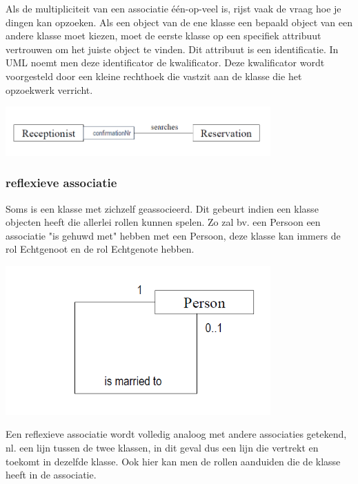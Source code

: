 Als de multipliciteit van een associatie één-op-veel is, rijst vaak de vraag hoe je dingen kan opzoeken. Als een object van de ene klasse een bepaald object van een andere klasse moet kiezen, moet de eerste klasse op een specifiek attribuut vertrouwen om het juiste object te vinden. Dit attribuut is een identificatie.
In UML noemt men deze identificator de kwalificator. Deze kwalificator wordt voorgesteld door een kleine rechthoek die vastzit aan de klasse die het opzoekwerk verricht.


\begin{center}
\includegraphics[width=4in]{img/qa1}%
\end{center}

\subsubsection{reflexieve associatie}

Soms is een klasse met zichzelf geassocieerd. Dit gebeurt indien een klasse objecten heeft die allerlei rollen kunnen spelen. Zo zal bv. een Persoon een associatie "is gehuwd met" hebben met een Persoon, deze klasse kan immers de rol Echtgenoot en de rol Echtgenote hebben.


\begin{center}
\includegraphics[width=4in]{img/ra1}%
\end{center}

Een reflexieve associatie wordt volledig analoog met andere associaties getekend, nl. een lijn tussen de twee klassen, in dit geval dus een lijn die vertrekt en toekomt in dezelfde klasse. Ook hier kan men de rollen aanduiden die de klasse heeft in de associatie.
\newpage
